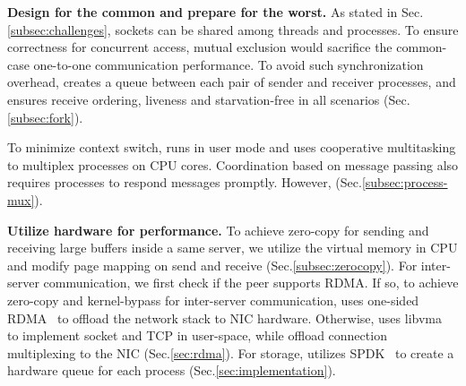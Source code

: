 \textbf{Design for the common and prepare for the worst.}
As stated in Sec.\ref{subsec:challenges}, sockets can be shared among threads and processes. To ensure correctness for concurrent access, mutual exclusion would sacrifice the common-case one-to-one communication performance. To avoid such synchronization overhead, \libipc creates a queue between each pair of sender and receiver processes, and ensures receive ordering, liveness and starvation-free in all scenarios (Sec.\ref{subsec:fork}).

To minimize context switch, \sys{} runs in user mode and uses cooperative multitasking to multiplex processes on CPU cores. Coordination based on message passing also requires processes to respond messages promptly. However,  (Sec.\ref{subsec:process-mux}).

\textbf{Utilize hardware for performance.}
To achieve zero-copy for sending and receiving large buffers inside a same server, we utilize the virtual memory in CPU and modify page mapping on send and receive (Sec.\ref{subsec:zerocopy}). For inter-server communication, we first check if the peer supports RDMA. If so, to achieve zero-copy and kernel-bypass for inter-server communication, \libipc uses one-sided RDMA~\cite{mitchell2013using} to offload the network stack to NIC hardware. Otherwise, \libipc uses libvma~\cite{libvma} to implement socket and TCP in user-space, while offload connection multiplexing to the NIC (Sec.\ref{sec:rdma}). For storage, \libipc utilizes SPDK~\cite{spdk} to create a hardware queue for each process (Sec.\ref{sec:implementation}).





